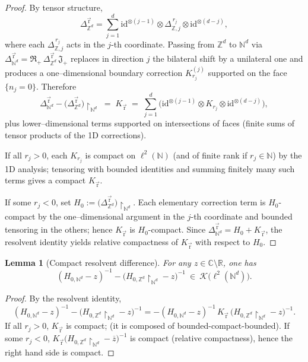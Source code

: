 \documentclass[10pt]{amsart}
\newcommand{\R}{{\mathbb{R}}}
\newcommand{\C}{{\mathbb{C}}}
\newcommand{\Z}{{\mathbb{Z}}}
\newcommand{\N}{{\mathbb{N}}}
\newcommand{\1}{{\mathbb{I}}}
\numberwithin{equation}{section}
\newtheorem{lemma}[theorem]{Lemma}%
\begin{document}
\begin{proof}
By tensor structure,
\[
\Delta^{\vec{\mathrm{r}}}_{\Z^d}
= \sum_{j=1}^d \mathrm{id}^{\otimes(j-1)}\otimes \Delta_{\Z,j}^{\,r_j}\otimes \mathrm{id}^{\otimes(d-j)},
\]
where each $\Delta_{\Z,j}^{\,r_j}$ acts in the $j$-th coordinate. Passing from $\Z^d$ to $\N^d$ via
$\Delta^{\vec{\mathrm{r}}}_{\N^d}=\mathfrak{R}_+\,\Delta^{\vec{\mathrm{r}}}_{\Z^d}\,\mathfrak{J}_+$
replaces in direction $j$ the bilateral shift by a unilateral one and produces a one--dimensional boundary
correction $K_{r_j}^{(j)}$ supported on the face $\{n_j=0\}$. Therefore
\[
\Delta^{\vec{\mathrm{r}}}_{\N^d} - \big(\Delta^{\vec{\mathrm{r}}}_{\Z^d}\big)\!\restriction_{\N^d}
\;=\; K_{\vec{\mathrm{r}}}
\;=\; \sum_{j=1}^d \Big( \mathrm{id}^{\otimes(j-1)}\otimes K_{r_j}\otimes \mathrm{id}^{\otimes(d-j)}\Big),
\]
plus lower--dimensional terms supported on intersections of faces (finite sums of tensor products of the 1D corrections).

If all $r_j>0$, each $K_{r_j}$ is compact on $\ell^2(\N)$ (and of finite rank if $r_j\in\N$) by the 1D analysis; tensoring with bounded identities and summing finitely many such terms gives a compact $K_{\vec{\mathrm{r}}}$.

If some $r_j<0$, set $H_0:=\big(\Delta^{\vec{\mathrm{r}}}_{\Z^d}\big)\!\restriction_{\N^d}$. Each elementary correction term is $H_0$-compact by the one--dimensional argument in the $j$-th coordinate and bounded tensoring in the others; hence $K_{\vec{\mathrm{r}}}$ is $H_0$-compact. Since $\Delta^{\vec{\mathrm{r}}}_{\N^d}=H_0+K_{\vec{\mathrm{r}}}$, the resolvent identity yields relative compactness of $K_{\vec{\mathrm{r}}}$ with respect to $H_0$.
\end{proof}

\begin{lemma}[Compact resolvent difference]\label{lem:05}
For any $z \in \C \setminus \R$, one has
\[
(H_{0,\N^d}-z)^{-1} - \big(H_{0,\Z^d}\!\restriction_{\N^d}-z\big)^{-1} \ \in\ \mathcal{K}\big(\ell^2(\N^d)\big).
\]
\end{lemma}

\begin{proof}
By the resolvent identity,
\[
(H_{0,\N^d}-z)^{-1} - \big(H_{0,\Z^d}\!\restriction_{\N^d}-z\big)^{-1}
= - (H_{0,\N^d}-z)^{-1} \, K_{\vec{\mathrm{r}}} \, \big(H_{0,\Z^d}\!\restriction_{\N^d}-z\big)^{-1}.
\]
If all $r_j > 0$, $K_{\vec{\mathrm{r}}}$ is compact;  (it is composed of bounded-compact-bounded).
If some $r_j < 0$, $K_{\vec{\mathrm{r}}}\big(H_{0,\Z^d}\!\restriction_{\N^d}-\overline z\big)^{-1}$ is compact (relative compactness), hence the right hand side is compact.
\end{proof}
\end{document}
